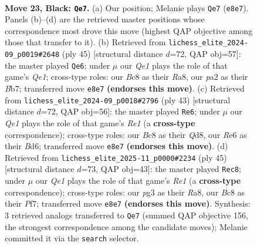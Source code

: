 \documentclass[11pt]{article}
\begin{document}
\clearpage

\begin{figure}[p]\centering
\begin{subfigure}{0.46\textwidth}\centering
\resizebox{\linewidth}{!}{%
\newchessgame
\chessboard[
  setfen={rnb1q1k1/1p5p/4r1p1/p3Np2/8/1QB1P1P1/P4PKP/1R2R3 b - - 1 23},
  showmover=false,
  pgfstyle=straightmove, color=movearrow, markmove={e8-e7}
]}
\caption{}
\end{subfigure}\hfill
\begin{subfigure}{0.46\textwidth}\centering
\resizebox{\linewidth}{!}{%
\newchessgame
\chessboard[
  setfen={r3q1k1/1bpr1pp1/7p/p7/Q7/P3B1P1/4PP1P/2R1R1K1 b - - 4 23},
  showmover=false,
  pgfstyle=straightmove, color=movearrow, markmove={e8-e6}
]}
\caption{}
\end{subfigure}
\\[4pt]
\begin{subfigure}{0.46\textwidth}\centering
\resizebox{\linewidth}{!}{%
\newchessgame
\chessboard[
  setfen={r2qr1k1/5p1p/p2b2pB/1p1Qp3/8/6P1/PP3PKP/3R1R2 b - - 1 22},
  showmover=false,
  pgfstyle=straightmove, color=movearrow, markmove={e8-e6}
]}
\caption{}
\end{subfigure}\hfill
\begin{subfigure}{0.46\textwidth}\centering
\resizebox{\linewidth}{!}{%
\newchessgame
\chessboard[
  setfen={r3r1k1/5pp1/2pqb2p/3p4/1P6/2P1Q2P/5PP1/3RRBK1 b - - 1 23},
  showmover=false,
  pgfstyle=straightmove, color=movearrow, markmove={e8-c8}
]}
\caption{}
\end{subfigure}
\caption{\textbf{Move 23, Black: \texttt{Qe7}.} (a) Our position; Melanie plays \texttt{Qe7} (\texttt{e8e7}). Panels (b)--(d) are the retrieved master positions whose correspondence most drove this move (highest QAP objective among those that transfer to it). (b) Retrieved from \texttt{lichess\_elite\_2024-09\_p0019\#2648} (ply 45) [structural distance $d$=72, QAP obj=57]: the master played \texttt{Qe6}; under $\mu$ our \emph{Qe1} plays the role of that game's \emph{Qe1}; cross-type roles: our \emph{B}c8 as their \emph{R}a8, our \emph{p}a2 as their \emph{B}b7; transferred move \texttt{e8e7} \textbf{(endorses this move)}. (c) Retrieved from \texttt{lichess\_elite\_2024-09\_p0018\#2796} (ply 43) [structural distance $d$=72, QAP obj=56]: the master played \texttt{Re6}; under $\mu$ our \emph{Qe1} plays the role of that game's \emph{Re1} (a \textbf{cross-type} correspondence); cross-type roles: our \emph{B}c8 as their \emph{Q}d8, our \emph{R}e6 as their \emph{B}d6; transferred move \texttt{e8e7} \textbf{(endorses this move)}. (d) Retrieved from \texttt{lichess\_elite\_2025-11\_p0000\#2234} (ply 45) [structural distance $d$=73, QAP obj=43]: the master played \texttt{Rec8}; under $\mu$ our \emph{Qe1} plays the role of that game's \emph{Re1} (a \textbf{cross-type} correspondence); cross-type roles: our \emph{p}g3 as their \emph{R}a8, our \emph{B}c8 as their \emph{P}f7; transferred move \texttt{e8e7} \textbf{(endorses this move)}. Synthesis: 3 retrieved analogs transferred to \texttt{Qe7} (summed QAP objective 156, the strongest correspondence among the candidate moves); Melanie committed it via the \texttt{search} selector.}
\label{fig:thought-m45}
\end{figure}
\end{document}
